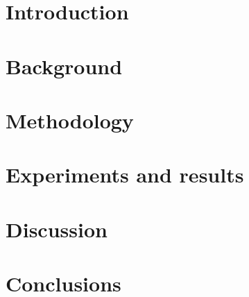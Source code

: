 \documentclass{report}
\begin{document}


{
  \hypersetup{linkcolor=black}
  \tableofcontents
}

\chapter{Introduction}
\label{chap:introduction}







\chapter{Background}
\label{chap:background}








\chapter{Methodology}
\label{chap:methodology}





\chapter{Experiments and results}
\label{chap:experiments}








\chapter{Discussion}
\label{chap:discussion}





\chapter{Conclusions}
\label{chap:conclusions}


 
% 


\appendix
{}
\chapter{}

\end{document}
